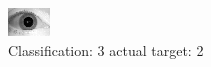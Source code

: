 \begin{figure}[h!]
\begin{center}
\includegraphics[width=0.60\columnwidth]{figures/ID1703_class_3_target_2.png}
\end{center}
\caption{ Classification: 3 actual target: 2}
\label{fig:ID1703_class_3_target_2}
\end{figure}
